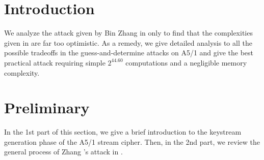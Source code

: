 \section{Introduction}
We analyze the attack given by Bin Zhang in \cite{AC:Zhang19} only to find that the complexities given in \cite{AC:Zhang19} are far too optimistic.
As a remedy, we give detailed analysis to all the possible tradeoffs in the guess-and-determine attacks on A5/1 and give the best practical attack requiring simple $2^{44.60}$ computations and a negligible memory complexity.


\section{Preliminary}
In the 1st part of this section, we give a brief introduction to the keystream generation phase of the A5/1 stream cipher.
Then, in the 2nd part, we review the general process of Zhang \etal's attack in \cite{AC:Zhang19}.
